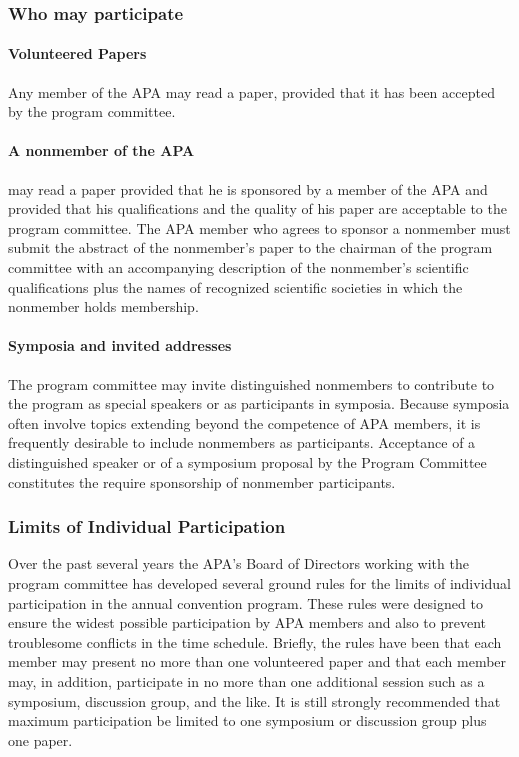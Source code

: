 \subsubsection{Who may participate}
\label{whomayparticipate}

\paragraph{Volunteered Papers}
\label{volunteeredpapers}

Any member of the APA may read a paper, provided that it has been accepted by the program committee.

\paragraph{A nonmember of the APA}
\label{anonmemberoftheapa}

may read a paper provided that he is sponsored by a member of the APA and provided that his qualifications and the quality of his paper are acceptable to the program committee. The APA member who agrees to sponsor a nonmember must submit the abstract of the nonmember's paper to the chairman of the program committee with an accompanying description of the nonmember's scientific qualifications plus the names of recognized scientific societies in which the nonmember holds membership.

\paragraph{Symposia and invited addresses}
\label{symposiaandinvitedaddresses}

The program committee may invite distinguished nonmembers to contribute to the program as special speakers or as participants in symposia. Because symposia often involve topics extending beyond the competence of APA members, it is frequently desirable to include nonmembers as participants. Acceptance of a distinguished speaker or of a symposium proposal by the Program Committee constitutes the require sponsorship of nonmember participants.

\subsubsection{Limits of Individual Participation}
\label{limitsofindividualparticipation}

Over the past several years the APA's Board of Directors working with the program committee has developed several ground rules for the limits of individual participation in the annual convention program. These rules were designed to ensure the widest possible participation by APA members and also to prevent troublesome conflicts in the time schedule. Briefly, the rules have been that each member may present no more than one volunteered paper and that each member may, in addition, participate in no more than one additional session such as a symposium, discussion group, and the like. It is still strongly recommended that maximum participation be limited to one symposium or discussion group plus one paper.

